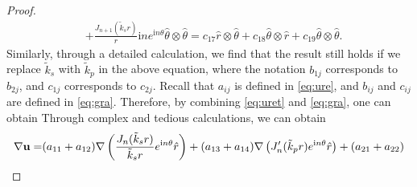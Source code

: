 \documentclass[11pt,reqno,twoside]{amsart}
\theoremstyle{definition}
\theoremstyle{remark}
\numberwithin{equation}{section}
\newcommand{\bu}{\mathbf{u}}
\begin{document}
\begin{proof}
\begin{align}
		&+\frac{J_{n+1} ( \tilde{k}_{s}  r )}{r}\mathrm{i}ne^{\mathrm{i}n\theta }\hat{\theta }\otimes\hat{\theta }=c_{17}\hat{r}\otimes\hat{\theta }+c_{18}\hat{\theta}\otimes\hat{r }+c_{19}\hat{\theta }\otimes\hat{\theta }.\label{eq:gra}
	\end{align}
	Similarly, through a detailed calculation, we find that the result still holds if we replace $\tilde{k}_{s}$ with $\tilde{k}_{p}$ in the above equation, where the notation $b_{1j}$ corresponds to $b_{2j}$, and $c_{1j}$ corresponds to $c_{2j}$. %
			Recall that \(a_{ij}\) is defined in \eqref{eq:ure}, and \(b_{ij}\) and \(c_{ij}\) are defined in \eqref{eq:gra}. Therefore, by combining \eqref{eq:uret} and \eqref{eq:gra}, one can obtain
			\fi
			Through complex and tedious calculations, we can obtain
			\begin{align}
				\nabla \bu=&(a_{11}+a_{12})\nabla \left ( \frac{J_{n} (\tilde{k}_{s}  r )}{\tilde{k}_{s}r} e^{\mathrm{i}n\theta } \hat{r}  \right )+(a_{13}+a_{14}) \nabla \left(J_{n}' (\tilde{k}_{p}  r ) e^{\mathrm{i}n\theta } \hat{r} \right)+(a_{21}+a_{22}) \notag\\

\end{align}
\end{proof}
\end{document}
